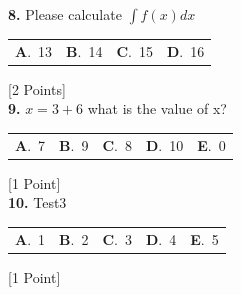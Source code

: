 \documentclass[12pt]{article}
\newcommand{\choice}[2]{\textbf{#1}.~#2}
\begin{document}
\noindent \textbf{\textenglish{8.}} {\textenglish{Please calculate }}\(\int f(x)dx\)

\begin{tabularx}{\linewidth}{@{}*{4}{Y}@{}}
\choice{A}{{{\textenglish{13}}}} & \choice{B}{{{\textenglish{14}}}} & \choice{C}{{{\textenglish{15}}}} & \choice{D}{{{\textenglish{16}}}} \\
\end{tabularx}
\hfill {\textenglish{[2 Points]}}\\[0.5em]

\noindent \textbf{\textenglish{9.}} \(x=3+6 \){\textenglish{ what is the value of x?}}

\begin{tabularx}{\linewidth}{@{}*{5}{Y}@{}}
\choice{A}{{{\textenglish{7}}}} & \choice{B}{{{\textenglish{9}}}} & \choice{C}{{{\textenglish{8}}}} & \choice{D}{{{\textenglish{10}}}} & \choice{E}{{{\textenglish{0}}}} \\
\end{tabularx}
\hfill {\textenglish{[1 Point]}}\\[0.5em]

\noindent \textbf{\textenglish{10.}} {\textenglish{Test3}}

\begin{tabularx}{\linewidth}{@{}*{5}{Y}@{}}
\choice{A}{{{\textenglish{1}}}} & \choice{B}{{{\textenglish{2}}}} & \choice{C}{{{\textenglish{3}}}} & \choice{D}{{{\textenglish{4}}}} & \choice{E}{{{\textenglish{5}}}} \\
\end{tabularx}
\hfill {\textenglish{[1 Point]}}\\[0.5em]
\end{document}
